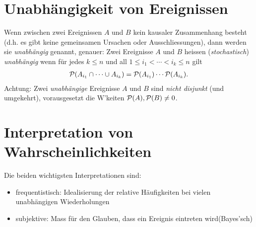\section{Unabhängigkeit von Ereignissen}
Wenn zwischen zwei Ereignissen $A$ und $B$ kein kausaler Zusammenhang besteht (d.h. es gibt keine gemeinsamen Ursachen oder Ausschliessungen), dann werden sie \emph{unabhängig} genannt, genauer: Zwei Ereignisse $A$ und $B$ heissen (\emph{stochastisch}) \emph{unabhängig} wenn für jedes $k\leq n$ und all $1\leq i_1< \cdots < i_k \leq n$ gilt
\begin{gather*}
	\mathcal P(A_{i_1}\cap \cdots \cup A_{i_{k}})=\mathcal P(A_{i_1})\cdots \mathcal P(A_{i_k}).
\end{gather*}
Achtung: Zwei \emph{unabhängige} Ereignisse $A$ und $B$ sind \emph{nicht disjunkt} (und umgekehrt), vorausgesetzt die W'keiten $\mathcal P(A), \mathcal P(B) \neq 0$.

\section{Interpretation von Wahrscheinlichkeiten}
Die beiden wichtigsten Interpretationen sind:
\begin{itemize}
	\item frequentistisch: \glqq Idealisierung der relative Häufigkeiten bei vielen unabhängigen Wiederholungen\grqq
	\item subjektive: \glqq Mass für den Glauben, dass ein Ereignis eintreten wird\grqq (Bayes'sch)
\end{itemize}
